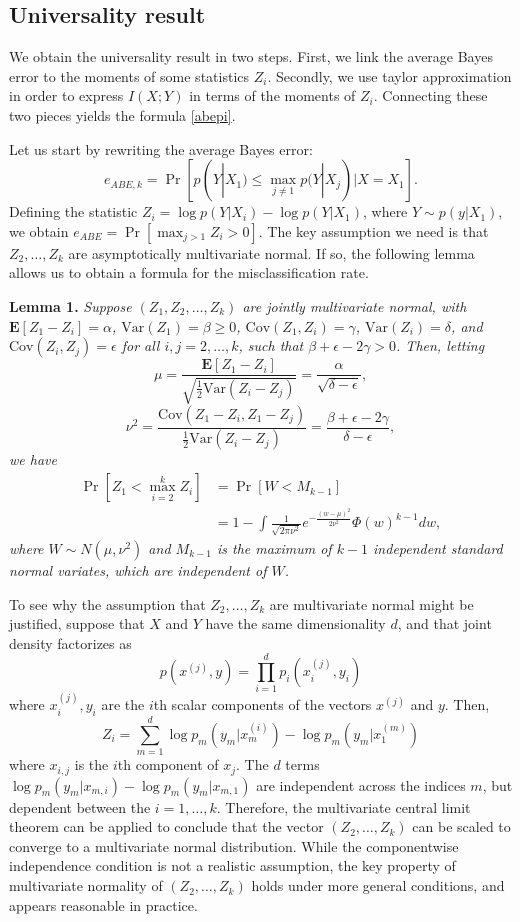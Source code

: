 \documentclass{article}
\newcommand{\E}{\textbf{E}}
\newcommand{\Cov}{\text{Cov}}
\newcommand{\Var}{\text{Var}}
\begin{document}
\subsection{Universality result}

We obtain the universality result in two steps.  First, we link the average Bayes error to the moments of
some statistics $Z_i$.  Secondly, we use taylor approximation in order to express $I(X; Y)$ in terms of the moments of $Z_i$.  Connecting these two pieces yields the formula \eqref{abepi}.

Let us start by rewriting the average Bayes error:
\[
e_{ABE, k} = \Pr[p(Y|X_1) \leq \max_{j \neq 1} p(Y|X_j)| X = X_1].
\]
Defining the statistic $Z_i = \log p(Y|X_i) - \log p(Y|X_1)$, where $Y \sim p(y|X_1)$, we obtain $
e_{ABE} = \Pr[\max_{j > 1} Z_i > 0].
$
The key assumption we need is that $Z_2,\hdots, Z_k$ are asymptotically multivariate normal.
If so, the following lemma
allows us to obtain a formula for the misclassification rate.

\textbf{Lemma 1. }
\emph{
Suppose $(Z_1, Z_2, \hdots, Z_k)$ are jointly multivariate normal, with 
$\E[Z_1 - Z_i]= \alpha$, 
$\Var(Z_1) = \beta \geq 0$, 
$\Cov(Z_1, Z_i) = \gamma$, 
$\Var(Z_i)= \delta$, and $\Cov(Z_i, Z_j) = \epsilon$ for all $i, j = 2, \hdots,
k$, such that $\beta + \epsilon - 2\gamma > 0$.  Then, letting
\[
\mu = \frac{\E[Z_1 - Z_i]}{\sqrt{\frac{1}{2}\Var(Z_i - Z_j)}} = \frac{\alpha}{\sqrt{\delta - \epsilon}},
\]
\[
\nu^2 = \frac{\Cov(Z_1 -Z_i, Z_1 - Z_j)}{\frac{1}{2}\Var(Z_i - Z_j)} = \frac{\beta + \epsilon - 2\gamma}{\delta - \epsilon},
\]
we have
\begin{align*}
\Pr[Z_1 < \max_{i=2}^k Z_i] &= \Pr[W < M_{k-1}]
\\&= 1 - \int \frac{1}{\sqrt{2\pi\nu^2}} e^{-\frac{(w-\mu)^2}{2\nu^2}} \Phi(w)^{k-1} dw,
\end{align*}
where $W \sim N(\mu, \nu^2)$ and $M_{k-1}$ is the maximum of $k-1$
independent standard normal variates, which are independent of $W$.
}

To see why the assumption that $Z_2,\hdots, Z_k$ are multivariate normal might be justified, suppose that $X$ and $Y$ have the same dimensionality $d$, and that
joint density factorizes as
\[
p(x^{(j)}, y) = \prod_{i=1}^d p_i(x^{(j)}_i, y_i)
\]
where $x_i^{(j)}, y_i$ are the $i$th scalar components of the vectors $x^{(j)}$ and $y$.
Then,
\[
Z_i = \sum_{m=1}^d \log p_m(y_m | x^{(i)}_m) - \log p_m(y_m | x^{(m)}_1)
\]
where $x_{i, j}$ is the $i$th component of $x_j$.
The $d$ terms $\log p_m(y_m | x_{m, i}) - \log p_m(y_m | x_{m, 1})$ are independent across the indices $m$,
but dependent between the $i = 1,\hdots, k$.
Therefore, the multivariate central limit theorem can be applied to conclude that the vector
$(Z_2,\hdots, Z_k)$ can be scaled to converge to a multivariate normal distribution.
While the componentwise independence condition is not a realistic assumption,
the key property of multivariate normality of $(Z_2,\hdots, Z_k)$ holds under more general conditions, and appears reasonable in practice.  
\end{document}
